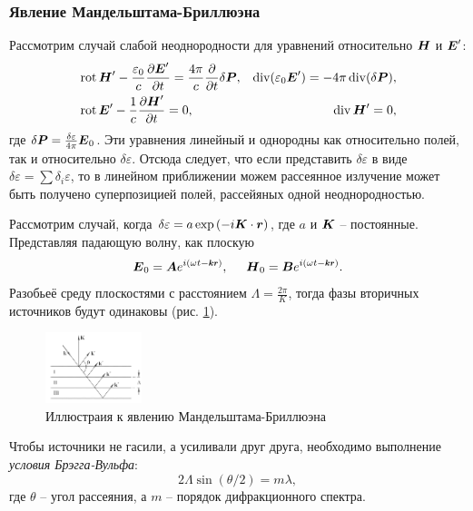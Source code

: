 \subsubsection{Явление Мандельштама-Бриллюэна}


Рассмотрим случай слабой неоднородности для уравнений относительно $\mbox{\boldmath $H$}$ и $\mbox{\boldmath $E$}'$:
\begin{align*}
    &\mathop{\mathrm{rot}}\nolimits \mbox{\boldmath $H$}' - \frac{\varepsilon_0}{c}\frac{\partial \mbox{\boldmath $E$}'}{\partial t} = \frac{4\pi}{c} \frac{\partial }{\partial t} \delta \mbox{\boldmath $P$},
    &\mathop{\mathrm{div}}\nolimits(\varepsilon_0 \mbox{\boldmath $E$}') = - 4 \pi \mathop{\mathrm{div}}\nolimits (\delta \mbox{\boldmath $P$}), \\
    &\mathop{\mathrm{rot}}\nolimits \mbox{\boldmath $E$}' - \frac{1}{c} \frac{\partial \mbox{\boldmath $H$}'}{\partial t} =0,
    &\mathop{\mathrm{div}}\nolimits \mbox{\boldmath $H$}' = 0,
\end{align*}
где $\delta \mbox{\boldmath $P$} = \frac{\delta \varepsilon}{4 \pi} \mbox{\boldmath $E$}_0$. 
Эти уравнения линейный и однородны как относительно полей, так и относительно $\delta \varepsilon$. Отсюда следует, что если представить $\delta \varepsilon$ в виде $\delta \varepsilon = \sum \delta_i \varepsilon$, то в линейном приближении можем рассеянное излучение может быть получено суперпозицией полей, рассейяных одной неоднородностью. 

Рассмотрим случай, когда $\delta \varepsilon = a \exp\left(-i \mbox{\boldmath $K$} \cdot \mbox{\boldmath $r$}\right)$, где $a$ и $\mbox{\boldmath $K$}$ -- постоянные. Представляя падающую волну, как плоскую
\begin{equation*}
    \vc{E}_0 = \vc{A} e^{i(\omega t - \smallvc{k} \smallvc{r})},
    \hspace{5 mm} 
    \vc{H}_0 = \vc{B} e^{i(\omega t -\smallvc{k} \smallvc{r})}.
\end{equation*}
Разобьеё среду плоскостями с расстоянием $\Lambda = \frac{2\pi}{K}$, тогда фазы вторичных источников будут одинаковы (рис. \ref{fig:ggg}). 
\begin{figure}[ht]
    \centering
    \includegraphics[width=0.25\textwidth]{figures/ggg.png}
    \caption{Иллюстраия к явлению Мандельштама-Бриллюэна}
    \label{fig:ggg}
\end{figure}
Чтобы источники не гасили, а усиливали друг друга, необходимо выполнение \textit{условия Брэгга-Вульфа}:
\begin{equation*}
    2 \Lambda \sin(\theta/2) = m \lambda,
\end{equation*}
где $\theta$ -- угол рассеяния, а $m$ -- порядок дифракционного спектра. 

